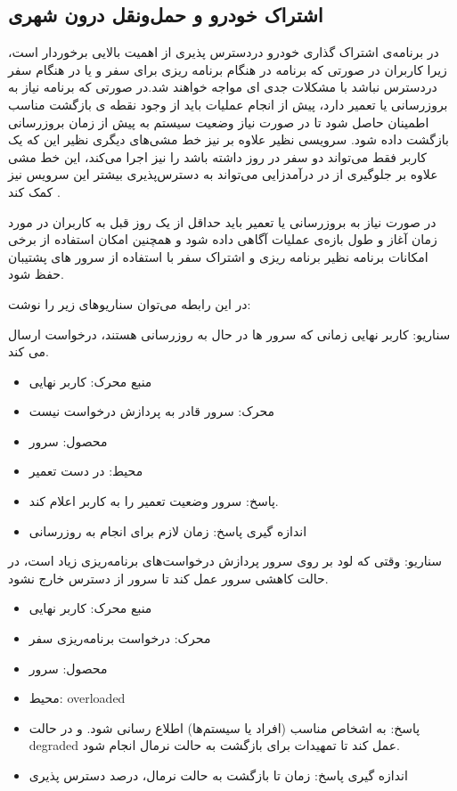 \subsection{اشتراک خودرو و حمل‌و‌نقل درون شهری}
در برنامه‌ی اشتراک گذاری خودرو دردسترس پذیری از اهمیت بالایی برخوردار است، زیرا کاربران در صورتی که برنامه در هنگام برنامه ریزی برای سفر و یا در هنگام سفر دردسترس نباشد با مشکلات جدی ای مواجه خواهند شد.در صورتی که برنامه نیاز به بروزرسانی یا تعمیر دارد، پیش از انجام عملیات باید از وجود نقطه ی بازگشت مناسب اطمینان حاصل شود تا در صورت نیاز وضعیت سیستم به پیش از زمان بروزرسانی بازگشت داده شود. سرویسی نظیر  علاوه بر نیز خط مشی‌های دیگری نظیر این که یک کاربر فقط می‌تواند دو سفر در روز داشته باشد را نیز اجرا می‌کند، این خط مشی علاوه بر جلوگیری از در درآمدزایی می‌تواند به دسترس‌پذیری بیشتر این سرویس نیز کمک کند  \cite{waze_two_days}.

در صورت نیاز به بروزرسانی یا تعمیر باید حداقل از یک روز قبل به کاربران در مورد زمان آغاز و طول بازه‌ی عملیات آگاهی  داده شود و همچنین امکان استفاده از برخی امکانات برنامه نظیر برنامه ریزی و اشتراک سفر با استفاده از سرور های پشتیبان حفظ شود.

در این رابطه می‌توان سناریو‌های زیر را نوشت:

سناریو: کاربر نهایی زمانی که سرور ها در حال به روزرسانی هستند، درخواست ارسال می کند.
\begin{itemize}
\item
منبع محرک: کاربر نهایی
\item
محرک: سرور قادر به پردازش درخواست نیست
\item
محصول: سرور
\item
محیط: در دست تعمیر
\item
پاسخ: سرور وضعیت تعمیر را به کاربر اعلام کند.
\item
اندازه گیری پاسخ: زمان لازم برای انجام به روز‌رسانی
\end{itemize}

سناریو: وقتی که لود بر روی سرور پردازش درخواست‌های برنامه‌ریزی زیاد است، در حالت کاهشی سرور عمل کند تا سرور از دسترس خارج نشود.
\begin{itemize}
\item
منبع محرک: کاربر نهایی
\item
محرک: درخواست برنامه‌ریزی سفر
\item
محصول: سرور
\item
محیط: overloaded
\item
پاسخ: به اشخاص مناسب (افراد یا سیستم‌ها) اطلاع رسانی شود. و در حالت degraded عمل کند تا تمهیدات برای بازگشت به حالت نرمال انجام شود.
\item
اندازه گیری پاسخ: زمان تا بازگشت به حالت نرمال، درصد دسترس پذیری 
\end{itemize}

